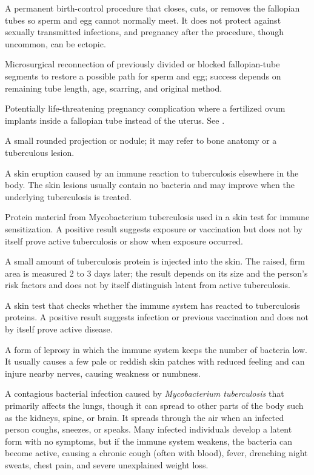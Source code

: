  A permanent birth-control procedure that closes, cuts, or removes the fallopian tubes so sperm and egg cannot normally meet. It does not protect against sexually transmitted infections, and pregnancy after the procedure, though uncommon, can be ectopic.

 Microsurgical reconnection of previously divided or blocked fallopian-tube segments to restore a possible path for sperm and egg; success depends on remaining tube length, age, scarring, and original method.

 Potentially life-threatening pregnancy complication where a fertilized ovum implants inside a fallopian tube instead of the uterus. See .

 A small rounded projection or nodule; it may refer to bone anatomy or a tuberculous lesion.

 A skin eruption caused by an immune reaction to tuberculosis elsewhere in the body. The skin lesions usually contain no bacteria and may improve when the underlying tuberculosis is treated.

 Protein material from Mycobacterium tuberculosis used in a skin test for immune sensitization. A positive result suggests exposure or vaccination but does not by itself prove active tuberculosis or show when exposure occurred.

 A small amount of tuberculosis protein is injected into the skin. The raised, firm area is measured 2 to 3 days later; the result depends on its size and the person’s risk factors and does not by itself distinguish latent from active tuberculosis.

 A skin test that checks whether the immune system has reacted to tuberculosis proteins. A positive result suggests infection or previous vaccination and does not by itself prove active disease.

 A form of leprosy in which the immune system keeps the number of bacteria low. It usually causes a few pale or reddish skin patches with reduced feeling and can injure nearby nerves, causing weakness or numbness.

 A contagious bacterial infection caused by \textit{Mycobacterium tuberculosis} that primarily affects the lungs, though it can spread to other parts of the body such as the kidneys, spine, or brain. It spreads through the air when an infected person coughs, sneezes, or speaks. Many infected individuals develop a latent form with no symptoms, but if the immune system weakens, the bacteria can become active, causing a chronic cough (often with blood), fever, drenching night sweats, chest pain, and severe unexplained weight loss.

